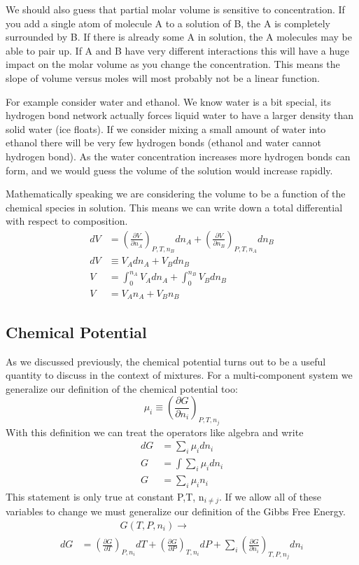 \documentclass{article}
\newcommand{\be}{\begin{equation}}
\newcommand{\ee}{\end{equation}}
\newcommand{\pd}{\partial}
\begin{document}
We should also guess that partial molar volume is sensitive to concentration. 
If you add a single atom of molecule A to a solution of B, the A is completely surrounded by B. 
If there is already some A in solution, the A molecules may be able to pair up.
If A and B have very different interactions this will have a huge impact on the molar volume as you change the concentration. 
This means the slope of volume versus moles will most probably not be a linear function. 

For example consider water and ethanol.
We know water is a bit special, its hydrogen bond network actually forces liquid water to have a larger density than solid water (ice floats). 
If we consider mixing a small amount of water into ethanol there will be very few hydrogen bonds (ethanol and water cannot hydrogen bond). 
As the water concentration increases more hydrogen bonds can form, and we would guess the volume of the solution would increase rapidly. 

Mathematically speaking we are considering the volume to be a function of the chemical species in solution. 
This means we can write down a total differential with respect to composition. 
\be
\begin{split}
dV &= \left(\frac{\pd V}{\pd n_A}\right)_{P,T, n_B} dn_A + \left(\frac{\pd V}{\pd n_B}\right)_{P,T, n_A} dn_B \\
dV &\equiv V_Adn_A + V_B dn_B \\
V &= \int_0^{n_A} V_Adn_A + \int_0^{n_B} V_B dn_B \\
V &= V_A n_A + V_B n_B
\end{split}
\ee

\subsection*{Chemical Potential}
As we discussed previously, the chemical potential turns out to be a useful quantity to discuss in the context of mixtures. 
For a multi-component system we generalize our definition of the chemical potential too:
\be
\mu_i \equiv \left(\frac{\pd G}{\pd n_i}\right)_{P,T,n_j}
\ee
With this definition we can treat the operators like algebra and write
\be
\begin{split} \label{GD}
dG &= \sum_i \mu_i dn_i\\
G &= \int \sum_i \mu_i dn_i\\
G &= \sum_i \mu_i n_i
\end{split}
\ee
This statement is only true at constant P,T, n$_{i\ne j}$.
If we allow all of these variables to change we must generalize our definition of the Gibbs Free Energy. 
\be
\begin{split}
& \qquad \qquad G(T,P,n_i) \rightarrow \\
dG &= \left(\frac{\pd G}{\pd T}\right)_{P,n_i} dT + \left(\frac{\pd G}{\pd P}\right)_{T,n_i} dP+ \sum_i \left(\frac{\pd G}{\pd n_i}\right)_{T,P,n_j} dn_i  
\end{split}
\ee
\end{document}
